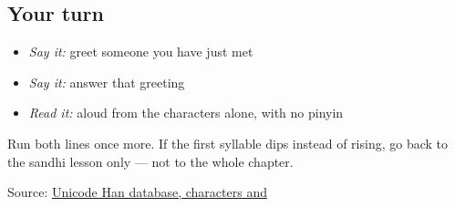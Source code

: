\subsection*{Your turn}
\begin{itemize}
\raggedright
  \item \emph{Say it:} greet someone you have just met
  \item \emph{Say it:} answer that greeting
  \item \emph{Read it:} \textbf{} aloud from the characters alone, with no pinyin
\end{itemize}

\begin{tcolorbox}[breakable,colback=teal!4,colframe=teal!35!black,title={Before you move on}]
Run both lines once more. If the first syllable dips instead of rising, go back to the sandhi lesson only — not to the whole chapter.

Source: \href{https://www.unicode.org/charts/PDF/U4E00.pdf}{Unicode Han database, characters  and }
\end{tcolorbox}
